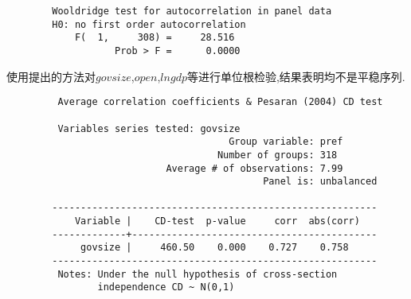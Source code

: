 \documentclass[10pt]{article}
\begin{document}
    \begin{framed}
    \begin{verbatim}
        Wooldridge test for autocorrelation in panel data
        H0: no first order autocorrelation
            F(  1,     308) =     28.516
                   Prob > F =      0.0000
    \end{verbatim}
    \end{framed}


    使用\cite{moon2004testing}提出的方法对$govsize$,$open$,$lngdp$等进行单位根检验,结果表明均不是平稳序列.
     \begin{framed}
    \begin{verbatim}
         Average correlation coefficients & Pesaran (2004) CD test

         Variables series tested: govsize
                                       Group variable: pref
                                     Number of groups: 318
                            Average # of observations: 7.99
                                             Panel is: unbalanced

        ---------------------------------------------------------
            Variable |    CD-test  p-value     corr  abs(corr)
        -------------+-------------------------------------------
             govsize |     460.50    0.000    0.727    0.758
        ---------------------------------------------------------
         Notes: Under the null hypothesis of cross-section 
                independence CD ~ N(0,1)
    \end{verbatim}
    \end{framed}   
\end{document}
